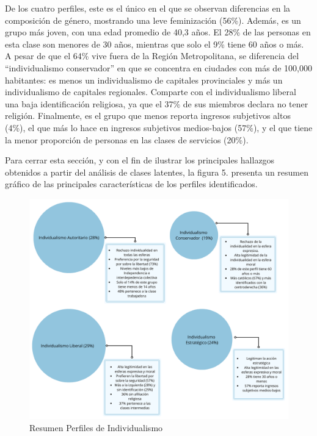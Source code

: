 \documentclass[12pt,oneside]{templates/facsothesis}
\begin{document}
De los cuatro perfiles, este es el único en el que se observan diferencias en la composición de género, mostrando una leve feminización (56\%). Además, es un grupo más joven, con una edad promedio de 40,3 años. El 28\% de las personas en esta clase son menores de 30 años, mientras que solo el 9\% tiene 60 años o más. A pesar de que el 64\% vive fuera de la Región Metropolitana, se diferencia del ``individualismo conservador'' en que se concentra en ciudades con más de 100,000 habitantes: es menos un individualismo de capitales provinciales y más un individualismo de capitales regionales. Comparte con el individualismo liberal una baja identificación religiosa, ya que el 37\% de sus miembros declara no tener religión. Finalmente, es el grupo que menos reporta ingresos subjetivos altos (4\%), el que más lo hace en ingresos subjetivos medios-bajos (57\%), y el que tiene la menor proporción de personas en las clases de servicios (20\%).

Para cerrar esta sección, y con el fin de ilustrar los principales hallazgos obtenidos a partir del análisis de clases latentes, la figura 5. presenta un resumen gráfico de las principales características de los perfiles identificados.

\begin{figure}[!ht]

{\centering \includegraphics[width=1\linewidth,]{images/fig-esferas} 

}

\caption{Resumen Perfiles de Individualismo}\label{fig:nombre}
\end{figure}
\end{document}

